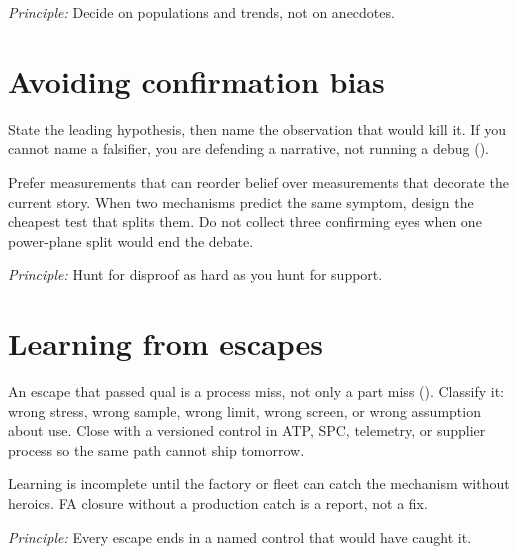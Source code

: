 \textit{Principle:} Decide on populations and trends, not on anecdotes.

\section{Avoiding confirmation bias}
\label{sec:staff-confirmation-bias}

State the leading hypothesis, then name the observation that would kill it.
If you cannot name a falsifier, you are defending a narrative, not running a
debug ().

Prefer measurements that can reorder belief over measurements that decorate
the current story. When two mechanisms predict the same symptom, design the
cheapest test that splits them. Do not collect three confirming eyes when one
power-plane split would end the debate.

\textit{Principle:} Hunt for disproof as hard as you hunt for support.

\section{Learning from escapes}
\label{sec:staff-escapes}

An escape that passed qual is a process miss, not only a part miss
(). Classify it: wrong stress, wrong
sample, wrong limit, wrong screen, or wrong assumption about use. Close with a
versioned control in ATP, SPC, telemetry, or supplier process so the same path
cannot ship tomorrow.

Learning is incomplete until the factory or fleet can catch the mechanism
without heroics. FA closure without a production catch is a report, not a fix.

\textit{Principle:} Every escape ends in a named control that would have caught
it.

